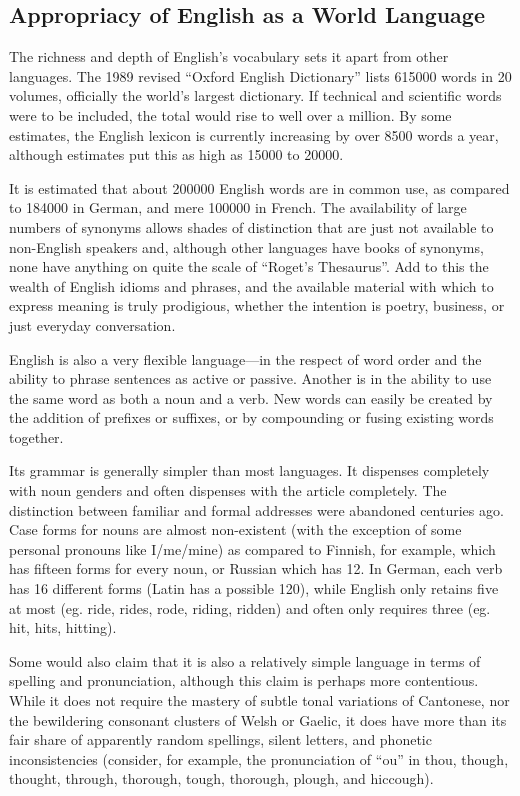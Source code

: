 \documentclass[../main.tex]{subfiles}
\begin{document}
        \subsection{Appropriacy of English as a World Language}
        The richness and depth of English's vocabulary sets it apart from other languages. The 1989 revised ``Oxford English Dictionary'' lists \num{615000} words in 20 volumes, officially the world's largest dictionary. If technical and scientific words were to be included, the total would rise to well over a million. By some estimates, the English lexicon is currently increasing by over 8500 words a year, although estimates put this as high as \num{15000} to \num{20000}. \par
        It is estimated that about \num{200000} English words are in common use, as compared to \num{184000} in German, and mere \num{100000} in French. The availability of large numbers of synonyms allows shades of distinction that are just not available to non-English speakers and, although other languages have books of synonyms, none have anything on quite the scale of ``Roget's  Thesaurus''. Add to this the wealth of English idioms and phrases, and the available material with which to express meaning is truly prodigious, whether the intention is poetry, business, or just everyday conversation. \par 
        English is also a very flexible language---in the respect of word order and the ability to phrase sentences as active or passive. Another is in the ability to use the same word as both a noun and a verb. New words can easily be created by the addition of prefixes or suffixes, or by compounding or fusing existing words together. \par
        Its grammar is generally simpler than most languages. It dispenses completely with noun genders and often dispenses with the article completely. The distinction between familiar and formal addresses were abandoned centuries ago. Case forms for nouns are almost non-existent (with the exception of some personal pronouns like I/me/mine) as compared to Finnish, for example, which has fifteen forms for every noun, or Russian which has 12. In German, each verb has 16 different forms (Latin has a possible 120), while English only retains five at most (eg. ride, rides, rode, riding, ridden) and often only requires three  (eg. hit, hits, hitting). \par
        Some would also claim that it is also a relatively simple language in terms of spelling and pronunciation, although this claim is perhaps more contentious. While it does not require the mastery of subtle tonal variations of Cantonese, nor the bewildering consonant clusters of Welsh or Gaelic, it does have more than its fair share of apparently random spellings, silent letters, and phonetic inconsistencies (consider, for example, the pronunciation of ``ou'' in thou, though, thought, through, thorough, tough, thorough, plough, and hiccough). \par
\end{document}
